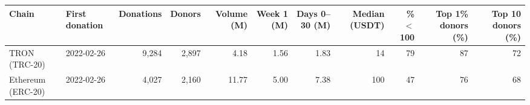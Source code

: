 \begin{tabular}{llrrrrrrrrr}
\toprule
\textbf{Chain} & \textbf{First donation} & \textbf{Donations} & \textbf{Donors} & \textbf{Volume (M)} & \textbf{Week 1 (M)} & \textbf{Days 0--30 (M)} & \textbf{Median (USDT)} & \textbf{\% $<$100} & \textbf{Top 1\% donors (\%)} & \textbf{Top 10 donors (\%)} \\
\midrule
TRON (TRC-20) & 2022-02-26 & 9,284 & 2,897 & 4.18 & 1.56 & 1.83 & 14 & 79 & 87 & 72 \\
Ethereum (ERC-20) & 2022-02-26 & 4,027 & 2,160 & 11.77 & 5.00 & 7.38 & 100 & 47 & 76 & 68 \\
\bottomrule
\end{tabular}

